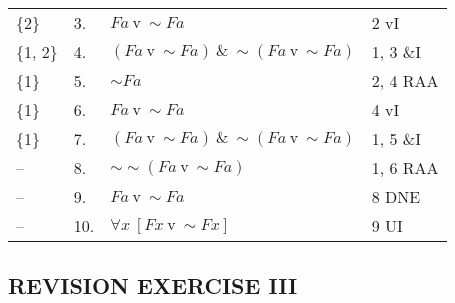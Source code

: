 \documentclass[a4paper,12pt]{article}
\newcommand{\s}{\sim}
\newcommand{\tv}{ \ \textrm{v} \ }
\newcommand{\ta}{ \ \& \ }
\newcommand{\all}{\forall}
\begin{document}
\begin{enumerate}[label=\arabic*,leftmargin=*]
\begin{enumerate}[label=\arabic*.]
\begin{minipage}{\textwidth}
\begin{tabular}{l l l l}
                        \{2\} & 3. & $Fa \tv \s Fa$ & 2 vI\\
                        \{1, 2\} & 4. & $(Fa \tv \s Fa) \ta \s (Fa \tv \s Fa)$ & 1, 3 \&I\\
                        \{1\} & 5. & $\s Fa$ & 2, 4 RAA\\
                        \{1\} & 6. & $Fa \tv \s Fa$ & 4 vI\\
                        \{1\} & 7. & $(Fa \tv \s Fa) \ta \s (Fa \tv \s Fa)$ & 1, 5 \&I\\
                        -- & 8. & $\s \s (Fa \tv \s Fa)$ & 1, 6 RAA\\
                        -- & 9. & $Fa \tv \s Fa$ & 8 DNE\\
                        -- & 10. & $\all x \ [Fx \tv \s Fx]$ & 9 UI\\
                    \end{tabular}
                    \vspace{1em}
                \end{minipage}
            \end{enumerate}

    \end{enumerate}

    \subsection*{REVISION EXERCISE III}
\end{document}
